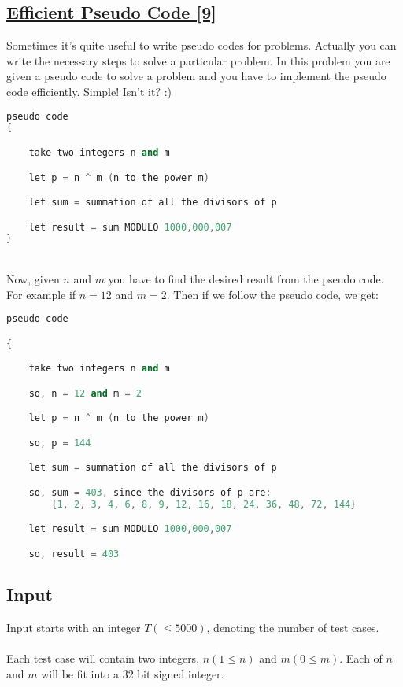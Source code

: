\documentclass[10pt,a4paper]{article}
\begin{document}
\begin{itemize}
\subsection*{\href{https://lightoj.com/problem/efficient-pseudo-code}{\underline{Efficient Pseudo Code [9]}}}

Sometimes it's quite useful to write pseudo codes for problems. Actually you can write the necessary steps to solve a particular problem. In this problem you are given a pseudo code to solve a problem and you have to implement the pseudo code efficiently. Simple! Isn't it? :)
\\

\begin{lstlisting}[language=C++, label={1st:code}, mathescape=true, breaklines=true]
pseudo code
{

    take two integers n and m

    let p = n ^ m (n to the power m)

    let sum = summation of all the divisors of p

    let result = sum MODULO 1000,000,007
}
\end{lstlisting}
\\
Now, given $n$ and $m$ you have to find the desired result from the pseudo code. For example if $n = 12$ and $m = 2$. Then if we follow the pseudo code, we get:

\begin{lstlisting}[language=C++, label={1st:code}, mathescape=true, breaklines=true]
pseudo code

{

    take two integers n and m

    so, n = 12 and m = 2

    let p = n ^ m (n to the power m)

    so, p = 144

    let sum = summation of all the divisors of p

    so, sum = 403, since the divisors of p are:
        {1, 2, 3, 4, 6, 8, 9, 12, 16, 18, 24, 36, 48, 72, 144}

    let result = sum MODULO 1000,000,007

    so, result = 403

\end{lstlisting}


\subsection*{Input}
Input starts with an integer $T (\leq 5000)$, denoting the number of test cases.
\\ \\
Each test case will contain two integers, $n (1 \leq n)$ and $m (0 \leq m)$. Each of $n$ and $m$ will be fit into a 32 bit signed integer.


\end{itemize}
\end{document}
